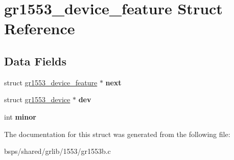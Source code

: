 \hypertarget{structgr1553__device__feature}{}\section{gr1553\+\_\+device\+\_\+feature Struct Reference}
\label{structgr1553__device__feature}
\subsection*{Data Fields}
\begin{DoxyCompactItemize}
\item 
\mbox{\label{structgr1553__device__feature_a118a94e3153fddf84f1819d5e632bcff}} 
struct \mbox{\hyperlink{structgr1553__device__feature}{gr1553\+\_\+device\+\_\+feature}} $\ast$ {\bfseries next}
\item 
\mbox{\label{structgr1553__device__feature_a72d2644cf20b7cf69573c91511e5da2f}} 
struct \mbox{\hyperlink{structgr1553__device}{gr1553\+\_\+device}} $\ast$ {\bfseries dev}
\item 
\mbox{\label{structgr1553__device__feature_a9cb263e4107408eb41de620e4e202b73}} 
int {\bfseries minor}
\end{DoxyCompactItemize}


The documentation for this struct was generated from the following file\+:\begin{DoxyCompactItemize}
\item 
bsps/shared/grlib/1553/gr1553b.\+c\end{DoxyCompactItemize}

